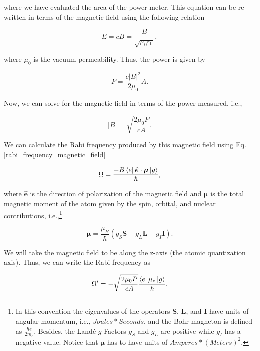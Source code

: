 \documentclass{article}
\begin{document}
where we have evaluated the area of the power meter. This equation can be re-written in terms of the magnetic field using the following relation

\begin{equation}
    E = c B = \frac{B}{\sqrt{\mu_{0} \epsilon_{0}}},
\end{equation}

where $\mu_{0}$ is the vacuum permeability. Thus, the power is given by

\begin{equation}\label{power_in_terms_of_B}
    P = \frac{c |B|^{2}}{2 \mu_{0}} A.
\end{equation}

Now, we can solve for the magnetic field in terms of the power measured, i.e.,

\begin{equation}
    |B| = \sqrt{\frac{2 \mu_{0} P}{c A}}.
\end{equation}

We can calculate the Rabi frequency produced by this magnetic field using Eq. \ref{rabi_frequency_magnetic_field}

\begin{equation*}
\Omega = \frac{- B \bra{e} \boldsymbol{\hat{e}} \cdot \boldsymbol{\mu} \ket{g}}{\hbar},
\end{equation*}

where $\boldsymbol{\hat{e}}$ is the direction of polarization of the magnetic field and $\boldsymbol{\mu}$ is the total magnetic moment of the atom given by the spin, orbital, and nuclear contributions, i.e.,\footnote{In this convention the eigenvalues of the operators $\boldsymbol{S}$, $\boldsymbol{L}$, and $\boldsymbol{I}$ have units of angular momentum, i.e., $Joules*Seconds$, and the Bohr magneton is defined as $\frac{\hbar e}{2 m_{e}}$. Besides, the Landé $g$-Factors $g_{S}$ and $g_{L}$ are positive while $g_{I}$ has a negative value. Notice that $\boldsymbol{\mu}$ has to have units of $Amperes*(Meters)^2$.}

\begin{equation}
     \boldsymbol{\mu} = \frac{\mu_{B}}{\hbar}(g_{S}\boldsymbol{S} + g_{L}\boldsymbol{L} - g_{I}\boldsymbol{I}).
\end{equation}

We will take the magnetic field to be along the z-axis (the atomic quantization axis). Thus, we can write the Rabi frequency as

\begin{equation}\label{working_freq_set_by_microwaves_power}
\Omega' = - \sqrt{\frac{2 \mu_{0} P}{c A}} \frac{\bra{e} \mu_{z} \ket{g}}{\hbar},
\end{equation}
\end{document}
